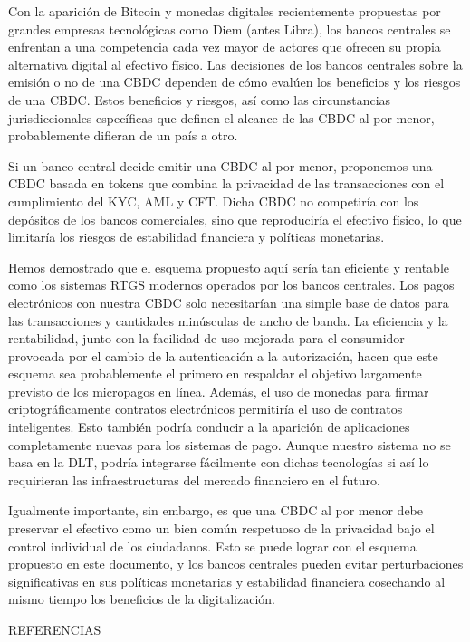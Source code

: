 \documentclass[10pt,spanish]{article}
\begin{document}
Con la aparición de Bitcoin y monedas digitales recientemente propuestas
por grandes empresas tecnológicas como Diem (antes Libra), los bancos
centrales se enfrentan a una competencia cada vez mayor de actores que
ofrecen su propia alternativa digital al efectivo físico. Las decisiones
de los bancos centrales sobre la emisión o no de una CBDC dependen de
cómo evalúen los beneficios y los riesgos de una CBDC. Estos beneficios
y riesgos, así como las circunstancias jurisdiccionales específicas que
definen el alcance de las CBDC al por menor, probablemente difieran de
un país a otro.

Si un banco central decide emitir una CBDC al por menor, proponemos una
CBDC basada en tokens que combina la privacidad de las transacciones con
el cumplimiento del KYC, AML y CFT. Dicha CBDC no competiría con los
depósitos de los bancos comerciales, sino que reproduciría el efectivo
físico, lo que limitaría los riesgos de estabilidad financiera y
políticas monetarias.

Hemos demostrado que el esquema propuesto aquí sería tan eficiente y
rentable como los sistemas RTGS modernos operados por los bancos
centrales. Los pagos electrónicos con nuestra CBDC solo necesitarían una
simple base de datos para las transacciones y cantidades minúsculas de
ancho de banda. La eficiencia y la rentabilidad, junto con la facilidad
de uso mejorada para el consumidor provocada por el cambio de la
autenticación a la autorización, hacen que este esquema sea
probablemente el primero en respaldar el objetivo largamente previsto de
los micropagos en línea. Además, el uso de monedas para firmar
criptográficamente contratos electrónicos permitiría el uso de contratos
inteligentes. Esto también podría conducir a la aparición de
aplicaciones completamente nuevas para los sistemas de pago. Aunque
nuestro sistema no se basa en la DLT, podría integrarse fácilmente con
dichas tecnologías si así lo requirieran las infraestructuras del
mercado financiero en el futuro.

Igualmente importante, sin embargo, es que una CBDC al por menor debe
preservar el efectivo como un bien común respetuoso de la privacidad
bajo el control individual de los ciudadanos. Esto se puede lograr con
el esquema propuesto en este documento, y los bancos centrales pueden
evitar perturbaciones significativas en sus políticas monetarias y
estabilidad financiera cosechando al mismo tiempo los beneficios de la
digitalización.


\newpage
REFERENCIAS


\end{document}
